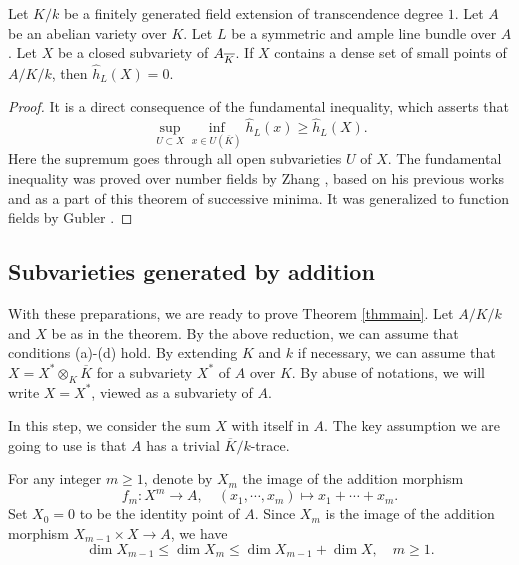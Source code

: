 \documentclass[12pt]{amsart}
\begin{document}
\begin{lem}\label{fundamental inequality} 
Let $K/k$ be a finitely generated field extension of transcendence degree $1$. 
Let $A$ be an abelian variety over $K$. Let $L$ be a symmetric and ample line bundle over $A$.
Let $X$ be a closed subvariety of $A_{\overline{K}}$.
If $X$ contains a dense set of small points of $A/K/k$, then $\widehat h_L(X)=0$.
\end{lem}
\begin{proof}
It is a direct consequence of the fundamental inequality, which asserts that
$$
\sup_{U\subset X} \inf_{x\in U(\overline K)}  
\widehat h_L(x)
\geq   \widehat h_L(X).$$
Here the supremum goes through all open subvarieties $U$ of $X$.
The fundamental inequality was proved over number fields by Zhang \cite[Theorem 1.10]{Zhang1995}, based on his previous works \cite{Zhang1992, Zhang1995a} and as a part of this theorem of successive minima. 
It was generalized to function fields by Gubler \cite[Lemma 4.1]{Gubler2007}. 
\end{proof}



 

\subsection{Subvarieties generated by addition}

With these preparations, we are ready to prove Theorem \ref{thmmain}. 
Let $A/K/k$ and $X$ be as in the theorem. 
By the above reduction, we can assume that conditions (a)-(d) hold.
By extending $K$ and $k$ if necessary, we can assume that $X=X^*\otimes_K \overline K$ for a subvariety $X^*$ of $A$ over $K$. 
By abuse of notations, we will write $X=X^*$, viewed as a subvariety of $A$.  

In this step, we consider the sum $X$ with itself in $A$. The key assumption we are going to use is that $A$ has a trivial $\overline K/k$-trace. 

For any integer $m\geq1$, denote by $X_m$ the image of the addition morphism 
$$f_m:X^m\longrightarrow A, \quad 
(x_1,\cdots, x_m) \longmapsto x_1+ \cdots+ x_m.$$ 
Set $X_0=0$ to be the identity point of $A$.
Since $X_m$ is the image of the addition morphism
$X_{m-1}\times X\to A$, we have
$$\dim X_{m-1}\leq \dim X_m\leq \dim X_{m-1}+\dim X, \quad m\geq1.$$ 
\end{document}
